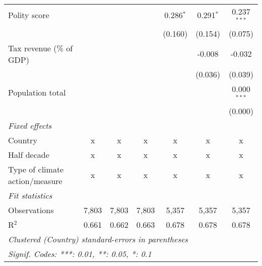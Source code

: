 \begin{tabular}{lcccccc}
   Polity score                                                 &               &                &                & 0.286$^{*}$    & 0.291$^{*}$    & 0.237$^{***}$\\   
                                                                &               &                &                & (0.160)        & (0.154)        & (0.075)\\   
   Tax revenue (\% of GDP)                                      &               &                &                &                & -0.008         & -0.032\\   
                                                                &               &                &                &                & (0.036)        & (0.039)\\   
   Population total                                             &               &                &                &                &                & 0.000$^{***}$\\   
                                                                &               &                &                &                &                & (0.000)\\   
   \emph{Fixed effects}\\
   Country                                                      & x             & x              & x              & x              & x              & x\\  
   Half decade                                                  & x             & x              & x              & x              & x              & x\\  
   Type of climate action/measure                               & x             & x              & x              & x              & x              & x\\  
   \midrule \emph{Fit statistics}\\
   Observations                                                 & 7,803         & 7,803          & 7,803          & 5,357          & 5,357          & 5,357\\  
   R$^2$                                                        & 0.661         & 0.662          & 0.663          & 0.678          & 0.678          & 0.678\\  
   \midrule
   \multicolumn{7}{l}{\emph{Clustered (Country) standard-errors in parentheses}}\\
   \multicolumn{7}{l}{\emph{Signif. Codes: ***: 0.01, **: 0.05, *: 0.1}}\\
\end{tabular}
\par\endgroup


